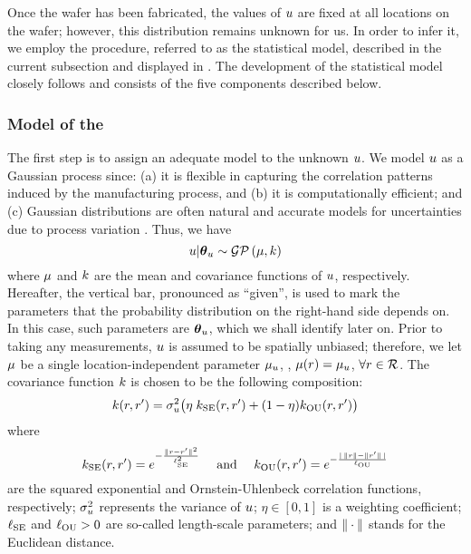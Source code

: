 Once the wafer has been fabricated, the values of $u$ are fixed at all locations on the wafer; however, this distribution remains unknown for us.
In order to infer it, we employ the procedure, referred to as the statistical model, described in the current subsection and displayed in .
The development of the statistical model closely follows  and consists of the five components described below.

\subsubsection{Model of the \qoi}
The first step is to assign an adequate model to the unknown $u$.
We model $u$ as a Gaussian process \cite{rasmussen2006} since: (a) it is flexible in capturing the correlation patterns induced by the manufacturing process, and (b) it is computationally efficient; and (c) Gaussian distributions are often natural and accurate models for uncertainties due to process variation \cite{srivastava2010, juan2012}. Thus, we have
\begin{equation} \elabel{u-prior}
  \u | \vparam_\u \sim \gaussianp{\fMean}{\fCov}
\end{equation}
where $\fMean$ and $\fCov$ are the mean and covariance functions of $u$, respectively.
Hereafter, the vertical bar, pronounced as ``given'', is used to mark the parameters that the probability distribution on the right-hand side depends on. In this case, such parameters are ${\boldsymbol\theta}_u$, which we shall identify later on.
Prior to taking any measurements, $u$ is assumed to be spatially unbiased; therefore, we let $\fMean$ be a single location-independent parameter $\mu_u$, \ie, $\fMean{r} = \mu_\u$, $\forall r \in \mathcal{R}$.
The covariance function $\fCov$ is chosen to be the following composition:
\begin{equation} \elabel{covariance-function}
  \fCov{\r, \r'} = \sigma_\u^2 \big( \eta \; \fCov_\SE(\r, \r') + (1 - \eta) \fCov_\OU(\r, \r') \big)
\end{equation}
where
\[
  \fCov_\SE(\r, \r') = e^{-\frac{\norm{\r - \r'}^2}{\ell_\SE^2}} \hspace{1em} \text{ and } \hspace{1em}
  \fCov_\OU(\r, \r') = e^{- \frac{\abs{\,\norm{\r} - \norm{\r'}\,}}{\ell_\OU}}
\]
are the squared exponential and Ornstein-Uhlenbeck correlation functions, respectively; $\sigma_u^2$ represents the variance of $u$; $\eta \in [0, 1]$ is a weighting coefficient; $\ell_{\text{SE}}$ and $\ell_{\text{OU}} > 0$ are so-called length-scale parameters; and $\| \cdot \|$ stands for the Euclidean distance.
